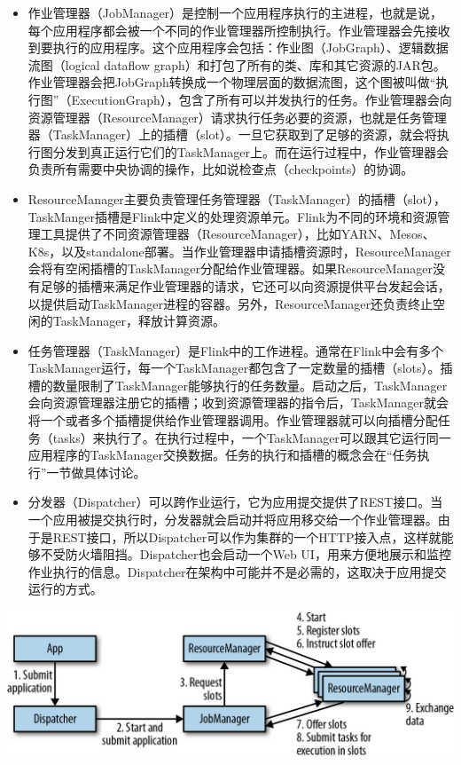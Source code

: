 \documentclass[cn,11pt,chinese]{elegantbook}
\providecommand{\tightlist}{%
  \setlength{\itemsep}{0pt}\setlength{\parskip}{0pt}}
\begin{document}
\begin{itemize}
\tightlist
\item
  作业管理器（JobManager）是控制一个应用程序执行的主进程，也就是说，每个应用程序都会被一个不同的作业管理器所控制执行。作业管理器会先接收到要执行的应用程序。这个应用程序会包括：作业图（JobGraph）、逻辑数据流图（logical
  dataflow
  graph）和打包了所有的类、库和其它资源的JAR包。作业管理器会把JobGraph转换成一个物理层面的数据流图，这个图被叫做``执行图''（ExecutionGraph），包含了所有可以并发执行的任务。作业管理器会向资源管理器（ResourceManager）请求执行任务必要的资源，也就是任务管理器（TaskManager）上的插槽（slot）。一旦它获取到了足够的资源，就会将执行图分发到真正运行它们的TaskManager上。而在运行过程中，作业管理器会负责所有需要中央协调的操作，比如说检查点（checkpoints）的协调。
\item
  ResourceManager主要负责管理任务管理器（TaskManager）的插槽（slot），TaskManger插槽是Flink中定义的处理资源单元。Flink为不同的环境和资源管理工具提供了不同资源管理器（ResourceManager），比如YARN、Mesos、K8s，以及standalone部署。当作业管理器申请插槽资源时，ResourceManager会将有空闲插槽的TaskManager分配给作业管理器。如果ResourceManager没有足够的插槽来满足作业管理器的请求，它还可以向资源提供平台发起会话，以提供启动TaskManager进程的容器。另外，ResourceManager还负责终止空闲的TaskManager，释放计算资源。
\item
  任务管理器（TaskManager）是Flink中的工作进程。通常在Flink中会有多个TaskManager运行，每一个TaskManager都包含了一定数量的插槽（slots）。插槽的数量限制了TaskManager能够执行的任务数量。启动之后，TaskManager会向资源管理器注册它的插槽；收到资源管理器的指令后，TaskManager就会将一个或者多个插槽提供给作业管理器调用。作业管理器就可以向插槽分配任务（tasks）来执行了。在执行过程中，一个TaskManager可以跟其它运行同一应用程序的TaskManager交换数据。任务的执行和插槽的概念会在``任务执行''一节做具体讨论。
\item
  分发器（Dispatcher）可以跨作业运行，它为应用提交提供了REST接口。当一个应用被提交执行时，分发器就会启动并将应用移交给一个作业管理器。由于是REST接口，所以Dispatcher可以作为集群的一个HTTP接入点，这样就能够不受防火墙阻挡。Dispatcher也会启动一个Web
  UI，用来方便地展示和监控作业执行的信息。Dispatcher在架构中可能并不是必需的，这取决于应用提交运行的方式。
\end{itemize}

\includegraphics{images/spaf_0301.png}
\end{document}

